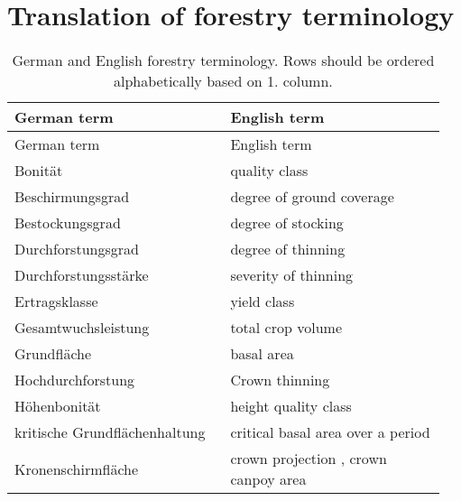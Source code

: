 \section{Translation of forestry terminology}

\begin{singlespace}
  {\tabulinesep=2mm
    \begin{longtabu}{p{0.475\linewidth} p{0.475\linewidth}}
      \caption{German and English forestry terminology.  Rows should be ordered alphabetically based on 1. column.} \\
      \toprule
      German term & English term \\
      \midrule
      \endfirsthead
      German term & English term \\
      \midrule
      \endhead
      \bottomrule
      \endlastfoot
      Bonität \parencite[p.~155]{Assmann1961} & quality class \parencite[p.~159]{Assmann1970} \\
      Beschirmungsgrad \parencite[p.~108]{Assmann1961} & degree of ground coverage \parencite[p.~110]{Assmann1970} \\
      Bestockungsgrad \parencite[p.~108]{Assmann1961} & degree of stocking \parencite[p.~110]{Assmann1970} \\
      Durchforstungsgrad \parencite[p.~209]{Assmann1961} & degree of thinning \parencite[p.~214]{Assmann1970} \\
      Durchforstungsstärke \parencite[p.~209]{Assmann1961} & severity of thinning \parencite[p.~214]{Assmann1970} \\
      Ertragsklasse \parencite[p.~155]{Assmann1961} & yield class \parencite[p.~159]{Assmann1970} \\
      Gesamtwuchsleistung \parencite[p.~149]{Assmann1961} & total crop volume \parencite[p.~152]{Assmann1970} \\
      Grundfläche & basal area \\
      Hochdurchforstung & Crown thinning \parencite[p.~162]{EFARES1953} \\
      Höhenbonität \parencite[p.~155]{Assmann1961} & height quality class \parencite[p.~159]{Assmann1970} \\
      kritische Grundflächenhaltung \parencite[p.~224]{Assmann1961} & critical basal area over a period \parencite[p.~229]{Assmann1970} \\
      Kronenschirmfläche \parencite[p.~154]{Assmann1961} &  crown projection \parencite[p.~157]{Assmann1970}, crown canpoy area \parencite[p.~158]{Assmann1970} \\

\end{longtabu}}
\end{singlespace}
